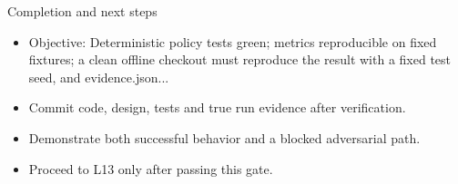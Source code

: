 \documentclass[aspectratio=169,10pt]{beamer}
\begin{document}
\begin{frame}{Completion and next steps}
\small
\begin{itemize}
\item Objective: Deterministic policy tests green; metrics reproducible on fixed fixtures; a clean offline checkout must reproduce the result with a fixed test seed, and evidence.json...
\item Commit code, design, tests and true run evidence after verification.
\item Demonstrate both successful behavior and a blocked adversarial path.
\item Proceed to L13 only after passing this gate.
\end{itemize}

\end{frame}
\end{document}
